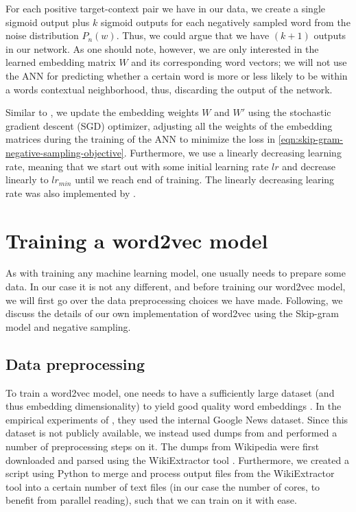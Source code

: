 For each positive target-context pair we have in our data, we create a single sigmoid output plus $k$ sigmoid outputs for each negatively sampled word from the noise distribution $P_n(w)$. Thus, we could argue that we have $(k + 1)$ outputs in our network. As one should note, however, we are only interested in the learned embedding matrix $W$ and its corresponding word vectors; we will not use the ANN for predicting whether a certain word is more or less likely to be within a words contextual neighborhood, thus, discarding the output of the network.

Similar to \cite{mikolov2013a}, we update the embedding weights $W$ and $W'$ using the stochastic gradient descent (SGD) optimizer, adjusting all the weights of the embedding matrices during the training of the ANN to minimize the loss in \cref{eqn:skip-gram-negative-sampling-objective}. Furthermore, we use a linearly decreasing learning rate, meaning that we start out with some initial learning rate $lr$ and decrease linearly to $lr_{min}$ until we reach end of training. The linearly decreasing learing rate was also implemented by \cite{mikolov2013a}.

\section{Training a word2vec model}
As with training any machine learning model, one usually needs to prepare some data. In our case it is not any different, and before training our word2vec model, we will first go over the data preprocessing choices we have made. Following, we discuss the details of our own implementation of word2vec using the Skip-gram model and negative sampling.

\subsection{Data preprocessing}
\label{sec:data-preprocessing}
To train a word2vec model, one needs to have a sufficiently large dataset (and thus embedding dimensionality) to yield good quality word embeddings \cite{mikolov2013b}. In the empirical experiments of \cite{mikolov2013b}, they used the internal Google News dataset. Since this dataset is not publicly available, we instead used dumps from \cite{WikimediaDumps} and performed a number of preprocessing steps on it. The dumps from Wikipedia were first downloaded and parsed using the WikiExtractor tool \cite{Wikiextractor2015}. Furthermore, we created a script using Python \cite{python3-2009} to merge and process output files from the WikiExtractor tool into a certain number of text files (in our case the number of cores, to benefit from parallel reading), such that we can train on it with ease.


